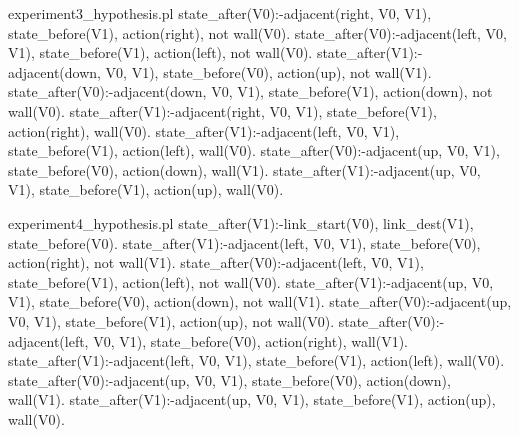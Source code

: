 \begin{filecontents*}{experiment3_hypothesis.pl}
state_after(V0):-adjacent(right, V0, V1), state_before(V1), 
                 action(right), not wall(V0).
state_after(V0):-adjacent(left, V0, V1), state_before(V1), 
                 action(left), not wall(V0).
state_after(V1):-adjacent(down, V0, V1), state_before(V0), 
                 action(up), not wall(V1).
state_after(V0):-adjacent(down, V0, V1), state_before(V1), 
                 action(down), not wall(V0).
state_after(V1):-adjacent(right, V0, V1), state_before(V1), 
                 action(right), wall(V0).
state_after(V1):-adjacent(left, V0, V1), state_before(V1), 
                 action(left), wall(V0).
state_after(V0):-adjacent(up, V0, V1), state_before(V0), 
                 action(down), wall(V1).
state_after(V1):-adjacent(up, V0, V1), state_before(V1), 
                 action(up), wall(V0).
\end{filecontents*}
  
\begin{filecontents*}{experiment4_hypothesis.pl}
state_after(V1):-link_start(V0), link_dest(V1), 
                 state_before(V0).
state_after(V1):-adjacent(left, V0, V1), state_before(V0), 
                 action(right), not wall(V1).
state_after(V0):-adjacent(left, V0, V1), state_before(V1), 
                 action(left), not wall(V0).
state_after(V1):-adjacent(up, V0, V1), state_before(V0), 
                 action(down), not wall(V1).
state_after(V0):-adjacent(up, V0, V1), state_before(V1), 
                 action(up), not wall(V0).
state_after(V0):-adjacent(left, V0, V1), state_before(V0), 
                 action(right), wall(V1).
state_after(V1):-adjacent(left, V0, V1), state_before(V1), 
                 action(left), wall(V0).
state_after(V0):-adjacent(up, V0, V1), state_before(V0), 
                 action(down), wall(V1).
state_after(V1):-adjacent(up, V0, V1), state_before(V1), 
                 action(up), wall(V0).  
\end{filecontents*}